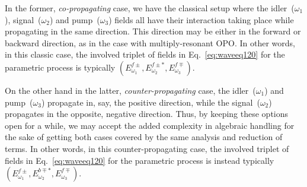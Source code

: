 In the former, {\it co-propagating} case, we have the classical setup where the
idler~($\omega_1$), signal~($\omega_2$) and pump~($\omega_3$) fields all have
their interaction taking place while propagating in the same direction. This
direction may be either in the forward or backward direction, as in the case
with multiply-resonant OPO. In other words, in this classic case, the involved
triplet of fields in Eq.~\eqref{eq:waveeq120} for the parametric process is
typically $(E^{f\pm}_{\omega_1},E^{f\pm*}_{\omega_2},E^{f\mp}_{\omega_3})$.

On the other hand in the latter, {\it counter-propagating} case, the
idler~($\omega_1$) and pump~($\omega_3$) propagate in, say, the positive
direction, while the signal~($\omega_2$) propagates in the opposite, negative
direction. Thus, by keeping these options open for a while, we may accept the
added complexity in algebraic handling for the sake of getting both cases
covered by the same analysis and reduction of terms.
In other words, in this counter-propagating case, the involved triplet of
fields in Eq.~\eqref{eq:waveeq120} for the parametric process is instead
typically $(E^{f\pm}_{\omega_1},E^{b\mp*}_{\omega_2},E^{f\mp}_{\omega_3})$.

